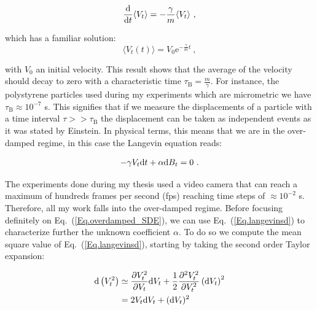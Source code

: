 \begin{equation}
	\frac{ \textnormal{d}}{\textnormal{d}t}\langle V_t \rangle = - \frac{\gamma}{m} \langle V_t \rangle ~,
\end{equation}

which has a familiar solution:
\begin{equation}
	\langle V_t (t) \rangle =   V_0 \mathrm{e}^{-\frac{\gamma}{m} t}~,
	\label{Eq.int_V_langevin}
\end{equation}

with $V_0$ an initial velocity. This result shows that the average of the velocity should decay to zero with a characteristic time $\tau_\mathrm{B} = \frac{m}{\gamma}$. For instance, the polystyrene particles used during my experiments which are micrometric we have $\tau_\mathrm{B} \approx 10^{-7}$ s. This signifies that if we measure the displacements of a particle with a time interval $ \tau  >> \tau _\mathrm{B} $ the displacement can be taken as independent events as it was stated by Einstein. In physical terms, this means that we are in the over-damped regime, in this case the Langevin equation reads:

\begin{equation}
	-\gamma V_t \textnormal{d}t  + \alpha  \textnormal{d}B_t = 0~.
	\label{Eq.overdamped_SDE}
\end{equation}

The experiments done during my thesis used a video camera that can reach a maximum of hundreds frames per second (\gls{fps}) reaching time steps of $\approx 10^{-2}$ s. Therefore, all my work falls into the over-damped regime. Before focusing definitely on Eq.~(\ref{Eq.overdamped_SDE}), we can use Eq.~(\ref{Eq.langevinsd}) to characterize further the unknown coefficient $\alpha$. To do so we compute the mean square value of Eq.~(\ref{Eq.langevinsd}), starting by taking the second order Taylor expansion:


\begin{equation}
	\begin{aligned}
		\textnormal{d}\left(V_t^2\right) &\simeq \frac{\partial V_t ^ 2}{\partial V_t} \textnormal{d} V_t + \frac{1}{2} \frac{\partial ^2 V_t^2}{\partial V_t ^2} \left( \textnormal{d}V_t \right)^2  \\
		& = 2 V_t \textnormal{d}V_t + (\textnormal{d}V_t)^2 \\ 
	\end{aligned}
	\label{Eq.compute1}
\end{equation}

